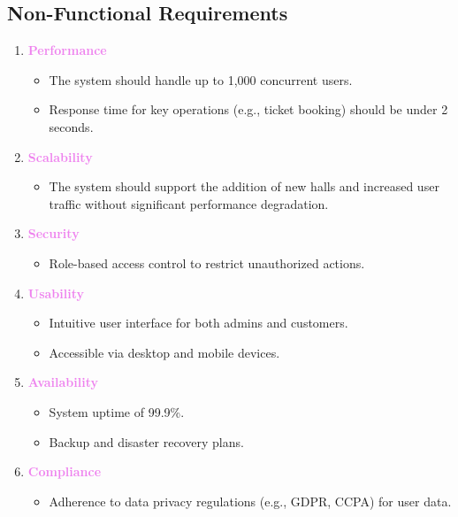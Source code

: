 \documentclass[a4paper,12pt]{article}  %
\renewcommand{\textbf}[1]{\textcolor{violet}{\bfseries #1}}
\begin{document}
\subsection{Non-Functional Requirements}

\begin{enumerate}
    \item \textbf{Performance}
    \begin{itemize}
        \item The system should handle up to 1,000 concurrent users.
        \item Response time for key operations (e.g., ticket booking) should be under 2 seconds.
    \end{itemize}
    
    \item \textbf{Scalability}
    \begin{itemize}
        \item The system should support the addition of new halls and increased user traffic without significant performance degradation.
    \end{itemize}
    
    \item \textbf{Security}
    \begin{itemize}
        \item Role-based access control to restrict unauthorized actions.
    \end{itemize}
    
    \item \textbf{Usability}
    \begin{itemize}
        \item Intuitive user interface for both admins and customers.
        \item Accessible via desktop and mobile devices.
    \end{itemize}
    
    \item \textbf{Availability}
    \begin{itemize}
        \item System uptime of 99.9\%.
        \item Backup and disaster recovery plans.
    \end{itemize}
    
    \item \textbf{Compliance}
    \begin{itemize}
        \item Adherence to data privacy regulations (e.g., GDPR, CCPA) for user data.
    \end{itemize}
\end{enumerate}
\end{document}
